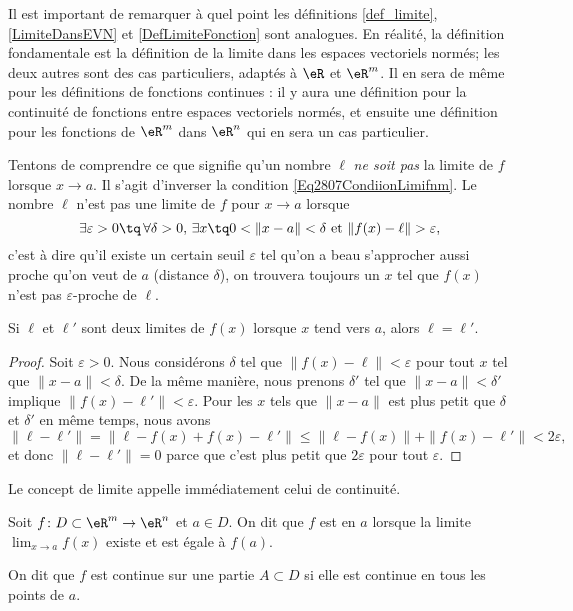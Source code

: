 \begin{remark}
	Il est important de remarquer à quel point les définitions \ref{def_limite}, \ref{LimiteDansEVN} et \ref{DefLimiteFonction} sont analogues. En réalité, la définition fondamentale est la définition de la limite dans les espaces vectoriels normés; les deux autres sont des cas particuliers, adaptés à $\eR$ et $\eR^m$. Il en sera de même pour les définitions de fonctions continues : il y aura une définition pour la continuité de fonctions entre espaces vectoriels normés, et ensuite une définition pour les fonctions de $\eR^m$ dans $\eR^n$ qui en sera un cas particulier.
\end{remark}

Tentons de comprendre ce que signifie qu'un nombre $\ell$ \emph{ne soit pas} la limite de $f$ lorsque $x\to a$. Il s'agit d'inverser la condition \eqref{Eq2807CondiionLimifnm}. Le nombre $\ell$ n'est pas une limite de $f$ pour $x\to a$ lorsque
\begin{equation}		\label{EqCaractNonLim}
	\exists\varepsilon>0\tq\,\forall\delta>0,\,\exists x\tq 0<\| x-a \|<\delta\text{ et }\| f(x)-\ell \|>\varepsilon,
\end{equation}
c'est à dire qu'il existe un certain seuil $\varepsilon$ tel qu'on a beau s'approcher aussi proche qu'on veut de $a$ (distance $\delta$), on trouvera toujours un $x$ tel que $f(x)$ n'est pas $\varepsilon$-proche de $\ell$.

\begin{lemma}
	Si $\ell$ et $\ell'$ sont deux limites de $f(x)$ lorsque $x$ tend vers $a$, alors $\ell=\ell'$.
\end{lemma}

\begin{proof}
	Soit $\varepsilon>0$. Nous considérons $\delta$ tel que $\| f(x)-\ell \|<\varepsilon$ pour tout $x$ tel que $\| x-a \|<\delta$. De la même manière, nous prenons $\delta'$ tel que $\| x-a \|<\delta'$ implique $\| f(x)-\ell' \|<\varepsilon$. Pour les $x$ tels que $\| x-a \|$ est plus petit que $\delta$ et $\delta'$ en même temps, nous avons
	\begin{equation}
		\| \ell-\ell' \|=\| \ell-f(x)+f(x)-\ell' \|\leq\| \ell-f(x) \|+\| f(x)-\ell' \|<2\varepsilon,
	\end{equation}
	et donc $\| \ell-\ell' \|=0$ parce que c'est plus petit que $2\varepsilon$ pour tout $\varepsilon$.
\end{proof}

Le concept de limite appelle immédiatement celui de continuité.
\begin{definition}
	Soit $f\colon D\subset\eR^m\to \eR^n $ et $a\in D$. On dit que $f$ est  en $a$ lorsque la limite $\lim_{x\to a} f(x)$ existe et est égale à $f(a)$.

	On dit que $f$ est continue sur une partie $A\subset D$ si elle est continue en tous les points de $a$.
\end{definition}

